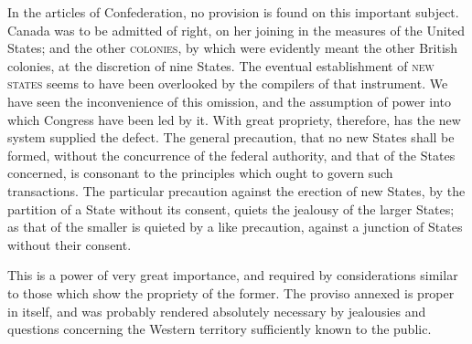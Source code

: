 In the articles of Confederation, no provision is found on this important subject. 
Canada was to be admitted of right, on her joining in the measures of the United States; and the other \textsc{colonies}, by which were evidently meant the other British colonies, at the discretion of nine States. 
The eventual establishment of \textsc{new states} seems to have been overlooked by the compilers of that instrument. 
We have seen the inconvenience of this omission, and the assumption of power into which Congress have been led by it. 
With great propriety, therefore, has the new system supplied the defect. 
The general precaution, that no new States shall be formed, without the concurrence of the federal authority, and that of the States concerned, is consonant to the principles which ought to govern such transactions. 
The particular precaution against the erection of new States, by the partition of a State without its consent, quiets the jealousy of the larger States; as that of the smaller is quieted by a like precaution, against a junction of States without their consent.

This is a power of very great importance, and required by considerations similar to those which show the propriety of the former. 
The proviso annexed is proper in itself, and was probably rendered absolutely necessary by jealousies and questions concerning the Western territory sufficiently known to the public.

